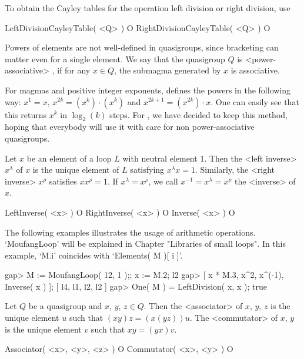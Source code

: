 To obtain the Cayley tables for the operation left division or
right division, use

\>LeftDivisionCayleyTable( <Q> ) O
\>RightDivisionCayleyTable( <Q> ) O


Powers of elements are not well-defined in quasigroups, since bracketing can
matter even for a single element. We say that the quasigroup $Q$ is
<power-associative>
%
%
, if for any $x\in Q$, the submagma generated by $x$ is
associative.

For magmas and positive integer exponents, {\GAP} defines the powers in the
following way: $x^1=x$, $x^{2k}=(x^k)\cdot(x^k)$ and $x^{2k+1}=(x^{2k})\cdot
x$. One can easily see that this returns $x^k$ in $\log_2(k)$ steps. For
{\LOOPS}, we have decided to keep this method, hoping that everybody will use
it with care for non power-associative quasigroups.

Let $x$ be an element of a loop $L$ with neutral element $1$. Then the
<left inverse>
%
%
 $x^\lambda$ of $x$ is the unique element of $L$ satisfying
$x^\lambda x=1$. Similarly, the <right inverse>
%
%
 $x^\rho$ satisfies
$xx^\rho=1$. If $x^\lambda=x^\rho$, we call $x^{-1}=x^\lambda=x^\rho$ the
<inverse>
%
%
 of $x$.

\>LeftInverse( <x> ) O
\>RightInverse( <x> ) O
\>Inverse( <x> ) O

The following examples illustrates the usage of arithmetic operations.
`MoufangLoop' will be explained in Chapter "Libraries of small loops". In this
example, `M.i' coincides with `Elements( M )[ i ]'.

\beginexample
gap> M := MoufangLoop( 12, 1 );; x := M.2;
l2
gap> [ x * M.3, x^2, x^(-1), Inverse( x ) ];
[ l4, l1, l2, l2 ]
gap> One( M ) = LeftDivision( x, x );
true
\endexample


Let $Q$ be a quasigroup and $x$, $y$, $z\in Q$. Then the <associator>
%
%
 of
$x$, $y$, $z$ is the unique element $u$ such that $(xy)z=(x(yz))u$. The
<commutator>
%
%
 of $x$, $y$ is the unique element $v$ such that $xy=(yx)v$.

\>Associator( <x>, <y>, <z> ) O
\>Commutator( <x>, <y> ) O

